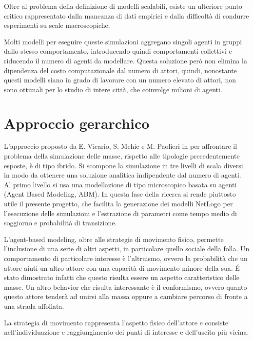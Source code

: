 Oltre al problema della definizione di modelli scalabili, esiste un ulteriore punto critico rappresentato dalla mancanza di dati empirici e dalla difficoltà di condurre esperimenti su scale macroscopiche.

Molti modelli per eseguire queste simulazioni aggregano singoli agenti in gruppi dallo stesso comportamento, introducendo quindi comportamenti collettivi e riducendo il numero di agenti da modellare. Questa soluzione però non elimina la dipendenza del costo computazionale dal numero di attori, quindi, nonostante questi modelli siano in grado di lavorare con un numero elevato di attori, non sono ottimali per lo studio di intere città, che coinvolge milioni di agenti.

\section{Approccio gerarchico}
\label{sec:approccio-gerarchico}

L'approccio proposto da E. Vicario, S. Mehic e M. Paolieri  in \cite{hierarchical-report} per affrontare il problema della simulazione delle masse, rispetto alle tipologie precedentemente esposte, è di tipo ibrido. Si scompone la simulazione in tre livelli di scala diversi in modo da ottenere una soluzione analitica indipendente dal numero di agenti.\\
Al primo livello si usa una modellazione di tipo microscopico basata su agenti (Agent Based Modeling, ABM). In questa fase della ricerca si rende piuttosto utile il presente progetto, che facilita la generazione dei modelli NetLogo per l'esecuzione delle simulazioni e l'estrazione di parametri come tempo medio di soggiorno e probabilità di transizione.

L'agent-based modeling, oltre alle strategie di movimento fisico, permette l'inclusione di una serie di altri aspetti, in particolare quello sociale della folla. Un comportamento di particolare interesse è l'altruismo, ovvero la probabilità che un attore aiuti un altro attore con una capacità di movimento minore della sua. \'E stato dimostrato infatti che questo risulta essere un aspetto caratteristico delle masse. Un altro behavior che risulta interessante è il conformismo, ovvero quanto questo attore tenderà ad unirsi alla massa oppure a cambiare percorso di fronte a una strada affollata.

La strategia di movimento rappresenta l'aspetto fisico dell'attore e consiste nell'individuazione e raggiungimento dei punti di interesse e dell'uscita più vicina.

